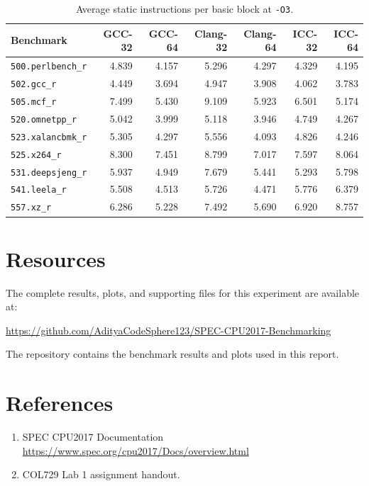 \documentclass[11pt,a4paper]{article}
\newcommand{\bench}[1]{\texttt{#1}}
\begin{document}
\begin{table}[H]
\centering
\caption{Average static instructions per basic block at \texttt{-O3}.}
\label{tab:bbO3}
\begin{tabular}{lrrrrrr}
\toprule
Benchmark & GCC-32 & GCC-64 & Clang-32 & Clang-64 & ICC-32 & ICC-64 \\
\midrule
\bench{500.perlbench\_r} & 4.839 & 4.157 & 5.296 & 4.297 & 4.329 & 4.195 \\
\bench{502.gcc\_r} & 4.449 & 3.694 & 4.947 & 3.908 & 4.062 & 3.783 \\
\bench{505.mcf\_r} & 7.499 & 5.430 & 9.109 & 5.923 & 6.501 & 5.174 \\
\bench{520.omnetpp\_r} & 5.042 & 3.999 & 5.118 & 3.946 & 4.749 & 4.267 \\
\bench{523.xalancbmk\_r} & 5.305 & 4.297 & 5.556 & 4.093 & 4.826 & 4.246 \\
\bench{525.x264\_r} & 8.300 & 7.451 & 8.799 & 7.017 & 7.597 & 8.064 \\
\bench{531.deepsjeng\_r} & 5.937 & 4.949 & 7.679 & 5.441 & 5.293 & 5.798 \\
\bench{541.leela\_r} & 5.508 & 4.513 & 5.726 & 4.471 & 5.776 & 6.379 \\
\bench{557.xz\_r} & 6.286 & 5.228 & 7.492 & 5.690 & 6.920 & 8.757 \\
\bottomrule
\end{tabular}
\end{table}
 
 \section{Resources}
\label{sec:resources}

The complete results, plots, and supporting files for this experiment are
available at:

\begin{center}
\url{https://github.com/AdityaCodeSphere123/SPEC-CPU2017-Benchmarking}
\end{center}

The repository contains the benchmark results and plots used in this report.

  \section {References}
\begin{enumerate}[leftmargin=*]
    \item SPEC CPU2017 Documentation \url{https://www.spec.org/cpu2017/Docs/overview.html}
    \item COL729 Lab 1 assignment handout.
\end{enumerate}
 
\end{document}
